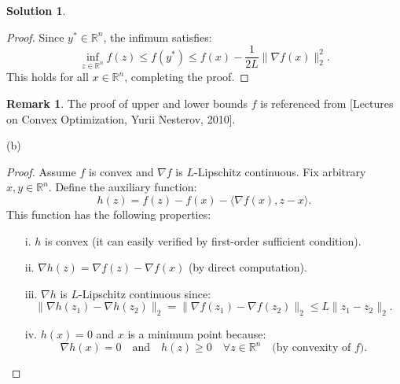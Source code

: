 \documentclass[12pt]{article}
\theoremstyle{definition}
\newtheorem*{solution}{\normalfont\textbf{Solution}}
\newtheorem*{Remark}{Remark}
\begin{document}
\begin{enumerate}[leftmargin=*]
\begin{solution}
\begin{proof}
                Since $y^* \in \mathbb{R}^n$, the infimum satisfies:
                \[
                \inf_{z \in \mathbb{R}^n} f(z) \leq f(y^*) \leq f(x) - \frac{1}{2L} \| \nabla f(x) \|_2^2.
                \]
                This holds for all $x \in \mathbb{R}^n$, completing the proof.
                \end{proof}
                \begin{Remark}
                    The proof of upper and lower bounds \(f\) is referenced from [Lectures on Convex Optimization, Yurii Nesterov, 2010].
                \end{Remark}
        \item[(b)] 
            \begin{proof}
            Assume \(f\) is convex and \(\nabla f\) is \(L\)-Lipschitz continuous. Fix arbitrary \(x, y \in \mathbb{R}^n\). Define the auxiliary function:
            \[
            h(z) = f(z) - f(x) - \langle \nabla f(x), z - x \rangle.
            \]
            This function has the following properties:
            \begin{itemize}
                \item[i.] \(h\) is convex (it can easily verified by first-order sufficient condition).
                \item[ii.] \(\nabla h(z) = \nabla f(z) - \nabla f(x)\) (by direct computation).
                \item[iii.] \(\nabla h\) is \(L\)-Lipschitz continuous since:
                \[
                \|\nabla h(z_1) - \nabla h(z_2)\|_2 = \|\nabla f(z_1) - \nabla f(z_2)\|_2 \leq L\|z_1 - z_2\|_2.
                \]
                \item[iv.] \(h(x) = 0\) and \(x\) is a minimum point because:
                \[
                \nabla h(x) = 0 \quad \text{and} \quad h(z) \geq 0 \quad \forall z \in \mathbb{R}^n \quad \text{(by convexity of \(f\))}.
                \]
                \end{itemize}


\end{proof}
\end{solution}
\end{enumerate}
\end{document}
